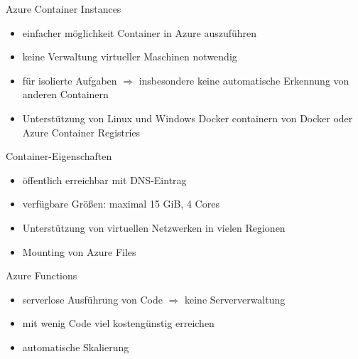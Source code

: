 \begin{flashcard}[]{Azure Container Instances}
  \begin{itemize}
    \item einfacher möglichkeit Container in Azure auszuführen
    \item keine Verwaltung virtueller Maschinen notwendig
    \item für isolierte Aufgaben\newline
      $\Rightarrow$ insbesondere keine automatische Erkennung von anderen Containern
    \item Unterstützung von Linux und Windows Docker containern von Docker oder Azure Container Registries
  \end{itemize}
\end{flashcard}

\begin{flashcard}[]{Container-Eigenschaften}
  \begin{itemize}
    \item öffentlich erreichbar mit DNS-Eintrag
    \item verfügbare Größen: maximal 15 GiB, 4 Cores
    \item Unterstützung von virtuellen Netzwerken in vielen Regionen
    \item Mounting von Azure Files
  \end{itemize}
\end{flashcard}

\begin{flashcard}[]{Azure Functions}
  \begin{itemize}
    \item serverlose Ausführung von Code\newline
      $\Rightarrow$ keine Serververwaltung
    \item mit wenig Code viel kostengünstig erreichen
    \item automatische Skalierung
  \end{itemize}
\end{flashcard}

